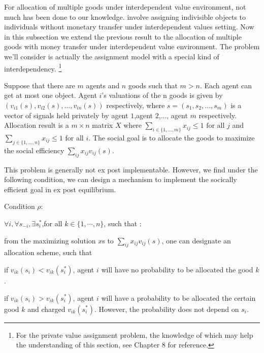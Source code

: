 For allocation of multiple goods under interdependent value environment, not much has been done to our knowledge. \parencite{Che2015} involve assigning indivisible objects to individuals without monetary transfer under interdependent values setting. Now in this subsection we extend the previous result to the allocation of multiple goods with money transfer under interdependent value environment.  The problem we'll consider is actually the assignment model with a special kind of interdependency. \footnote{For the private value assignment problem, the knowledge of which may help the understanding of this section, see Chapter 8 \parencite{Roth1990}for reference.} 

Suppose that there are $m$ agents and $n$ goods such that $m > n$. Each agent can get at most one object.   Agent $i$'s valuations of the n goods is given by $(v_{i1}(s),v_{i2}(s),...,v_{in}(s))$ respectively, where $s=(s_1,s_2,...,s_m)$ is a vector of signals held privately by agent $1$,agent $2$,..., agent $m$ respectively. Allocation result is a $m \times n$ matrix $X$ where $\sum_{i\in\{1,...,m\}}x_{ij} \leq 1 \text{ for all } j$ and  $\sum_{j\in\{1,...,n\}}x_{ij} \leq 1 \text{ for all } i$. The social goal is to allocate the goods to maximize the social efficiency $\sum_{ij}x_{ij}v_{ij}(s)$.

This problem is generally not ex post implementable. However, we find under the following condition, we can design a mechanism to implement the socically efficient goal in ex post equilibrium.

Condition $\rho$:

$\forall i,\forall s_{-i}, \exists s_i^*$,for all $k \in \{1,\cdots,n\}$, such that :

from the maximizing solution $x$s to  $\sum_{ij}x_{ij}v_{ij}(s)$, one can designate an allocation scheme, such that


if $v_{ik}(s_i) < v_{ik}(s_i^*)$, agent $i$ will have no probability to be allocated the good $k$. %

if $v_{ik}(s_i) > v_{ik}(s_i^*)$, agent $i$ will have a probability to be allocated the certain good $k$ and charged $ v_{ik}(s_i^*)$. However, the probability does not depend on $s_i$. %



